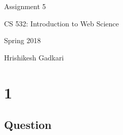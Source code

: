 \documentclass[letterpaper,11pt]{article}
\begin{document}
\begin{titlepage}

\begin{center}

\Huge{Assignment 5}

\Large{CS 532:  Introduction to Web Science}

\Large{Spring 2018}

\Large{Hrishikesh Gadkari}


\end{center}

\end{titlepage}

\newpage


\section*{1}

\subsection*{Question}
\end{document}
